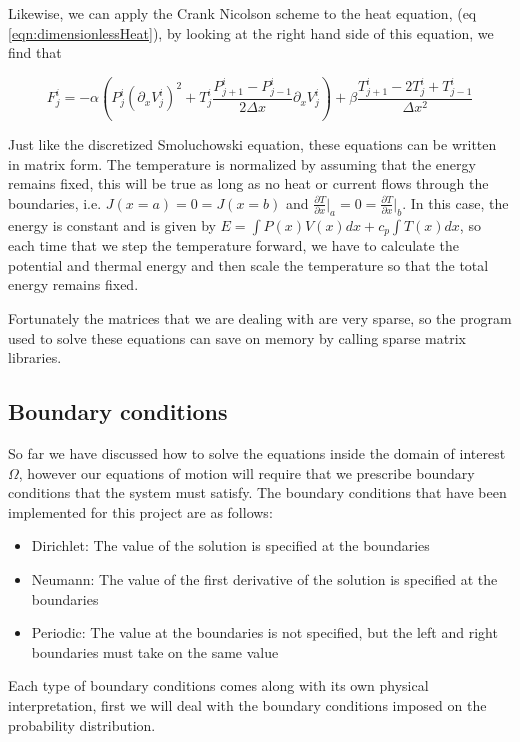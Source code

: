 Likewise, we can apply the Crank Nicolson scheme to the heat equation, (eq \ref{eqn:dimensionlessHeat}), by looking at the right hand side of this equation, we find that

\begin{equation}
F_j^i = -\alpha \left (P_j^i (\partial_x V_j^i)^2 + T_j^i \frac{P_{j+1}^i - P_{j-1}^i }{2 \Delta x}\partial_x V_j^i  \right) + \beta \frac{T_{j+1}^i - 2T_j^i + T_{j-1}^i}{\Delta x^2}
\end{equation}

Just like the discretized Smoluchowski equation, these equations can be written in matrix form. The temperature is normalized by assuming that the energy remains fixed, this will be true as long as no heat or current flows through the boundaries, i.e. $J(x=a) = 0 = J(x = b)$ and $\frac{\partial T}{\partial x} \rvert_a = 0 = \frac{\partial T}{\partial x} \rvert_b$. In this case, the energy is constant and is given by $E = \int P(x) V(x) dx + c_p \int T(x) dx$, so each time that we step the temperature forward, we have to calculate the potential and thermal energy and then scale the temperature so that the total energy remains fixed.

Fortunately the matrices that we are dealing with are very sparse, so the program used to solve these equations can save on memory by calling sparse matrix libraries.

\subsection{Boundary conditions}
So far we have discussed how to solve the equations inside the domain of interest $\Omega$, however our equations of motion will require that we prescribe boundary conditions that the system must satisfy. The boundary conditions that have been implemented for this project are as follows:

\begin{itemize}
\item{Dirichlet: The value of the solution is specified at the boundaries}
\item{Neumann: The value of the first derivative of the solution is specified at the boundaries}
\item{Periodic: The value at the boundaries is not specified, but the left and right boundaries must take on the same value}
\end{itemize}
Each type of boundary conditions comes along with its own physical interpretation, first we will deal with the boundary conditions imposed on the probability distribution.

